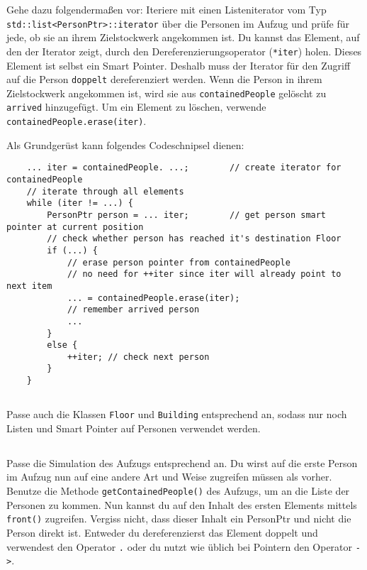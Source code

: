 Gehe dazu folgendermaßen vor:
Iteriere mit einen Listeniterator vom Typ \texttt{std::list<PersonPtr>::iterator} über die Personen im Aufzug und prüfe für jede, ob sie an ihrem Zielstockwerk angekommen ist.
Du kannst das Element, auf den der Iterator zeigt, durch den Dereferenzierungsoperator (\texttt{*iter}) holen.
Dieses Element ist selbst ein Smart Pointer.
Deshalb muss der Iterator für den Zugriff auf die Person \texttt{doppelt} dereferenziert werden.
Wenn die Person in ihrem Zielstockwerk angekommen ist, wird sie aus \texttt{containedPeople} gelöscht zu \texttt{arrived} hinzugefügt.
Um ein Element zu löschen, verwende \texttt{containedPeople.erase(iter)}.


Als Grundgerüst kann folgendes Codeschnipsel dienen:

\begin{lstlisting}
	... iter = containedPeople. ...;		// create iterator for containedPeople
	// iterate through all elements
	while (iter != ...) {
		PersonPtr person = ... iter; 		// get person smart pointer at current position
		// check whether person has reached it's destination Floor
		if (...) {
			// erase person pointer from containedPeople
			// no need for ++iter since iter will already point to next item
			... = containedPeople.erase(iter);
			// remember arrived person
			...
		}
		else {
			++iter; // check next person
		}
	}
\end{lstlisting}

\subsection{}
Passe auch die Klassen \texttt{Floor} und \texttt{Building} entsprechend an, sodass nur noch Listen und Smart Pointer auf Personen verwendet werden.

\subsection{}
Passe die Simulation des Aufzugs entsprechend an.
Du wirst auf die erste Person im Aufzug nun auf eine andere Art und Weise zugreifen müssen als vorher.
Benutze die Methode \texttt{getContainedPeople()} des Aufzugs, um an die Liste der Personen zu kommen.
Nun kannst du auf den Inhalt des ersten Elements mittels \texttt{front()} zugreifen.
Vergiss nicht, dass dieser Inhalt ein PersonPtr und nicht die Person direkt ist.
Entweder du dereferenzierst das Element doppelt und verwendest den Operator \texttt{.} oder du nutzt wie üblich bei Pointern den Operator \texttt{->}.

